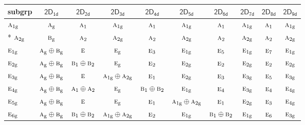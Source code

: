 \documentclass[10pt,a4paper]{article}
\numberwithin{equation}{section}
\newcommand{\grp}[1]{\mathsf{#1}}
\newcommand{\irr}[1]{\text{\normalfont\scshape #1}}
\newcommand{\ptag}[1]{\mathrm{#1}}
\begin{document}
{\small\begin{longtable}{@{}lccccccccc@{}}\toprule
subgrp & \href{2D1d.pdf}{$\grp{2D_{1d}}$} & \href{2D2d.pdf}{$\grp{2D_{2d}}$} & \href{2D3d.pdf}{$\grp{2D_{3d}}$} & \href{2D4d.pdf}{$\grp{2D_{4d}}$} & \href{2D5d.pdf}{$\grp{2D_{5d}}$} & \href{2D6d.pdf}{$\grp{2D_{6d}}$} & \href{2D7d.pdf}{$\grp{2D_{7d}}$} & \href{2D8d.pdf}{$\grp{2D_{8d}}$} & \href{2D9d.pdf}{$\grp{2D_{9d}}$}\\\midrule\endhead
\bottomrule\endfoot\endlastfoot
$\irr{a}_{1\ptag{g}}$ & $\irr{a}_{\ptag{g}}$ & $\irr{a}_{1}$ & $\irr{a}_{1\ptag{g}}$ & $\irr{a}_{1}$ & $\irr{a}_{1\ptag{g}}$ & $\irr{a}_{1}$ & $\irr{a}_{1\ptag{g}}$ & $\irr{a}_{1}$ & $\irr{a}_{1\ptag{g}}$\\*
$\irr{a}_{2\ptag{g}}$ & $\irr{b}_{\ptag{g}}$ & $\irr{a}_{2}$ & $\irr{a}_{2\ptag{g}}$ & $\irr{a}_{2}$ & $\irr{a}_{2\ptag{g}}$ & $\irr{a}_{2}$ & $\irr{a}_{2\ptag{g}}$ & $\irr{a}_{2}$ & $\irr{a}_{2\ptag{g}}$\\
$\irr{e}_{1\ptag{g}}$ & $\irr{a}_{\ptag{g}}\oplus \irr{b}_{\ptag{g}}$ & $\irr{e}$ & $\irr{e}_{\ptag{g}}$ & $\irr{e}_{3}$ & $\irr{e}_{1\ptag{g}}$ & $\irr{e}_{5}$ & $\irr{e}_{1\ptag{g}}$ & $\irr{e}_{7}$ & $\irr{e}_{1\ptag{g}}$\\
$\irr{e}_{2\ptag{g}}$ & $\irr{a}_{\ptag{g}}\oplus \irr{b}_{\ptag{g}}$ & $\irr{b}_{1}\oplus \irr{b}_{2}$ & $\irr{e}_{\ptag{g}}$ & $\irr{e}_{2}$ & $\irr{e}_{2\ptag{g}}$ & $\irr{e}_{2}$ & $\irr{e}_{2\ptag{g}}$ & $\irr{e}_{2}$ & $\irr{e}_{2\ptag{g}}$\\
$\irr{e}_{3\ptag{g}}$ & $\irr{a}_{\ptag{g}}\oplus \irr{b}_{\ptag{g}}$ & $\irr{e}$ & $\irr{a}_{1\ptag{g}}\oplus \irr{a}_{2\ptag{g}}$ & $\irr{e}_{1}$ & $\irr{e}_{2\ptag{g}}$ & $\irr{e}_{3}$ & $\irr{e}_{3\ptag{g}}$ & $\irr{e}_{5}$ & $\irr{e}_{3\ptag{g}}$\\
$\irr{e}_{4\ptag{g}}$ & $\irr{a}_{\ptag{g}}\oplus \irr{b}_{\ptag{g}}$ & $\irr{a}_{1}\oplus \irr{a}_{2}$ & $\irr{e}_{\ptag{g}}$ & $\irr{b}_{1}\oplus \irr{b}_{2}$ & $\irr{e}_{1\ptag{g}}$ & $\irr{e}_{4}$ & $\irr{e}_{3\ptag{g}}$ & $\irr{e}_{4}$ & $\irr{e}_{4\ptag{g}}$\\
$\irr{e}_{5\ptag{g}}$ & $\irr{a}_{\ptag{g}}\oplus \irr{b}_{\ptag{g}}$ & $\irr{e}$ & $\irr{e}_{\ptag{g}}$ & $\irr{e}_{1}$ & $\irr{a}_{1\ptag{g}}\oplus \irr{a}_{2\ptag{g}}$ & $\irr{e}_{1}$ & $\irr{e}_{2\ptag{g}}$ & $\irr{e}_{3}$ & $\irr{e}_{4\ptag{g}}$\\
$\irr{e}_{6\ptag{g}}$ & $\irr{a}_{\ptag{g}}\oplus \irr{b}_{\ptag{g}}$ & $\irr{b}_{1}\oplus \irr{b}_{2}$ & $\irr{a}_{1\ptag{g}}\oplus \irr{a}_{2\ptag{g}}$ & $\irr{e}_{2}$ & $\irr{e}_{1\ptag{g}}$ & $\irr{b}_{1}\oplus \irr{b}_{2}$ & $\irr{e}_{1\ptag{g}}$ & $\irr{e}_{6}$ & $\irr{e}_{3\ptag{g}}$\\

\end{longtable}}
\end{document}

